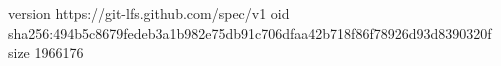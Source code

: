 version https://git-lfs.github.com/spec/v1
oid sha256:494b5c8679fedeb3a1b982e75db91c706dfaa42b718f86f78926d93d8390320f
size 1966176

